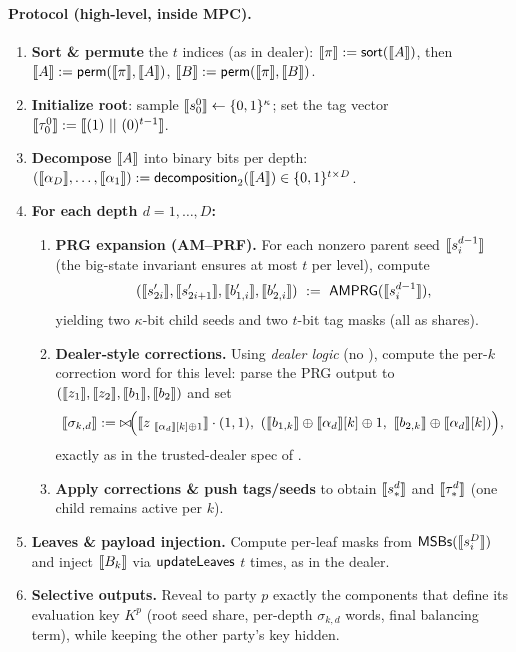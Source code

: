\paragraph{Protocol (high-level, inside MPC).}
\begin{enumerate}
  \item \textbf{Sort \& permute} the $t$ indices (as in dealer): $\share{\pi}:=\sort(\share{A})$, then $\share{A}:=\perm(\share{\pi},\share{A})$, $\share{B}:=\perm(\share{\pi},\share{B})$.
  \item \textbf{Initialize root}: sample $\share{s^0_0}\gets\{0,1\}^\kappa$; set the tag vector $\share{\t^0_0}:=\share{(1)\concat(0)^{t-1}}$.
  \item \textbf{Decompose} $\share{A}$ into binary bits per depth: $(\share{\alpha_D},\ldots,\share{\alpha_1}) := \mathsf{decomposition}_2(\share{A})\in\{0,1\}^{t\times D}$.
  \item \textbf{For each depth $d=1,\ldots,D$:}
  \begin{enumerate}
    \item \textbf{PRG expansion (AM--PRF).} For each nonzero parent seed $\share{s^{d-1}_i}$ (the big-state invariant ensures at most $t$ per level), compute
    \[
      (\share{s'_{2i}},\share{s'_{2i+1}},\share{b'_{1,i}},\share{b'_{2,i}})\ :=\ \AMPRG(\share{s^{d-1}_i}),
    \]
    yielding two $\kappa$-bit child seeds and two $t$-bit tag masks (all as shares).
    \item \textbf{Dealer-style corrections.} Using \emph{dealer logic} (no \SharedIPD), compute the per-$k$ correction word for this level:
    parse the PRG output to $(\share{z_1},\share{z_2},\share{b_1},\share{b_2})$ and set
    \[
      \share{\sigma_{k,d}} := \zip\!\Big(\share{z_{\ \share{\alpha_d}[k]\oplus 1}}\cdot (1,1),\ (\share{b_{1,k}}\oplus \share{\alpha_d}[k]\oplus 1,\ \share{b_{2,k}}\oplus \share{\alpha_d}[k])\Big),
    \]
    exactly as in the trusted-dealer spec of \cite{dmpf}.
    \item \textbf{Apply corrections \& push tags/seeds} to obtain $\share{s^d_{*}}$ and $\share{\t^{d}_{*}}$ (one child remains active per $k$).
  \end{enumerate}
  \item \textbf{Leaves \& payload injection.} Compute per-leaf masks from $\msbs(\share{s^D_i})$ and inject $\share{B_k}$ via $\textsf{updateLeaves}$ $t$ times, as in the dealer.
  \item \textbf{Selective outputs.} Reveal to party $p$ exactly the components that define its evaluation key $K^p$ (root seed share, per-depth $\sigma_{k,d}$ words, final balancing term), while keeping the other party’s key hidden.
\end{enumerate}

